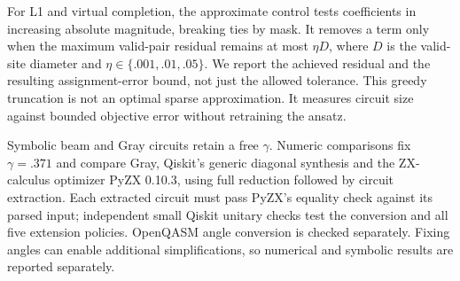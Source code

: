 For L1 and virtual completion, the approximate control tests coefficients in
increasing absolute magnitude, breaking ties by mask. It removes a term only
when the maximum valid-pair residual remains at most $\eta D$, where $D$ is
the valid-site diameter and $\eta\in\{.001,.01,.05\}$. We report the achieved
residual and the resulting assignment-error bound, not just the allowed
tolerance. This greedy truncation is not an optimal sparse approximation.
It measures circuit size against bounded objective error without retraining
the ansatz.

Symbolic beam and Gray circuits retain a free $\gamma$. Numeric comparisons
fix $\gamma=.371$ and compare Gray, Qiskit's generic diagonal synthesis and
the ZX-calculus optimizer PyZX 0.10.3, using full reduction followed by
circuit extraction. Each extracted
circuit must pass PyZX's equality check against its parsed input; independent
small Qiskit unitary checks test the conversion and all five extension policies.
OpenQASM angle conversion is checked separately. Fixing angles can enable
additional simplifications, so numerical and symbolic results are reported
separately.

